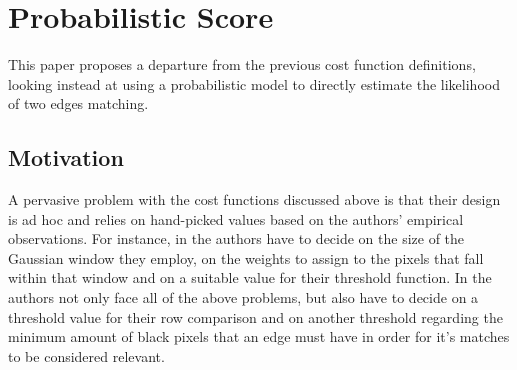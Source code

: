 \chapter{Probabilistic Score}
\label{chap4}
This paper proposes a departure from the previous cost function definitions, looking instead at using a probabilistic model to directly estimate the likelihood of two edges matching.
\section{Motivation}
A pervasive problem with the cost functions discussed above is that their design is ad hoc and relies on hand-picked values based on the authors' empirical observations. For instance, in \cite{P1} the authors have to decide on the size of the Gaussian window they employ, on the weights to assign to the pixels that fall within that window and on a suitable value for their threshold function.  In \cite{P2} the authors not only face all of the above problems, but also have to decide on a threshold value for their row comparison and on another threshold regarding the minimum amount of black pixels that an edge must have in order for it's matches to be considered relevant. 

